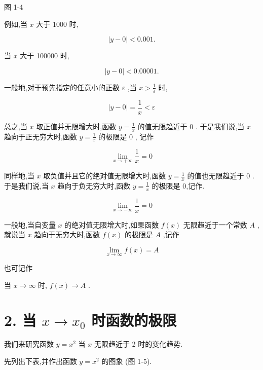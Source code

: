 \documentclass[10pt]{article}
\begin{document}
图 1-4

例如,当 \(x\) 大于 1000 时,

\[
\left| {y - 0}\right| < {0.001}\text{.}
\]

当 \(x\) 大于 100000 时,

\[
\left| {y - 0}\right| < {0.00001}\text{.}
\]

一般地,对于预先指定的任意小的正数 \(\varepsilon\) ,当 \(x > \frac{1}{\varepsilon }\) 时,

\[
\left| {y - 0}\right| = \frac{1}{x} < \varepsilon
\]

总之,当 \(x\) 取正值并无限增大时,函数 \(y = \frac{1}{x}\) 的值无限趋近于 0 . 于是我们说,当 \(x\) 趋向于正无穷大时,函数 \(y = \frac{1}{x}\) 的极限是 0 , 记作

\[
\mathop{\lim }\limits_{{x \rightarrow + \infty }}\frac{1}{x} = 0
\]

同样地,当 \(x\) 取负值并且它的绝对值无限增大时,函数 \(y = \frac{1}{x}\) 的值也无限趋近于 0 . 于是我们说,当 \(x\) 趋向于负无穷大时,函数 \(y = \frac{1}{x}\) 的极限是 0,记作.

\[
\mathop{\lim }\limits_{{x \rightarrow - \infty }}\frac{1}{x} = 0
\]

一般地,当自变量 \(x\) 的绝对值无限增大时,如果函数 \(f\left( x\right)\) 无限趋近于一个常数 \(A\) ,就说当 \(x\) 趋向于无穷大时,函数 \(f\left( x\right)\) 的极限是 \(A\) ,记作

\[
\mathop{\lim }\limits_{{x \rightarrow \infty }}f\left( x\right) = A
\]

也可记作

当 \(x \rightarrow \infty\) 时, \(f\left( x\right) \rightarrow A\) .

\section*{2. 当 \(x \rightarrow {x}_{0}\) 时函数的极限}

我们来研究函数 \(y = {x}^{2}\) 当 \(x\) 无限趋近于 2 时的变化趋势.

先列出下表,并作出函数 \(y = {x}^{2}\) 的图象 (图 1-5).

\begin{center}
\end{center}
\end{document}
